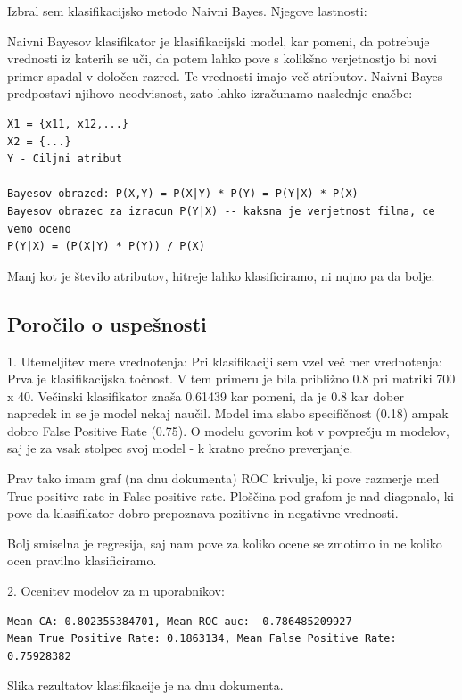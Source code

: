 \documentclass[a4paper,11pt]{article}
\begin{document}
	Izbral sem klasifikacijsko metodo Naivni Bayes. Njegove lastnosti:

Naivni Bayesov klasifikator je klasifikacijski model, kar pomeni, da potrebuje vrednosti iz katerih se uči, da potem lahko
pove s kolikšno verjetnostjo bi novi primer spadal v določen razred.
Te vrednosti imajo več atributov. Naivni Bayes predpostavi njihovo neodvisnost, zato lahko izračunamo naslednje enačbe:
\begin{lstlisting}
X1 = {x11, x12,...}
X2 = {...}
Y - Ciljni atribut

Bayesov obrazed: P(X,Y) = P(X|Y) * P(Y) = P(Y|X) * P(X)
Bayesov obrazec za izracun P(Y|X) -- kaksna je verjetnost filma, ce vemo oceno
P(Y|X) = (P(X|Y) * P(Y)) / P(X)

\end{lstlisting}

Manj kot je število atributov, hitreje lahko klasificiramo, ni nujno pa da bolje.



	\subsection{Poročilo o uspešnosti}
1. Utemeljitev mere vrednotenja:
Pri klasifikaciji sem vzel več mer vrednotenja:
Prva je klasifikacijska točnost. V tem primeru je bila približno 0.8 pri matriki 700 x 40.
Večinski klasifikator znaša 0.61439 kar pomeni, da je 0.8 kar dober napredek in se je model nekaj naučil.
Model ima slabo specifičnost (0.18) ampak dobro False Positive Rate (0.75).
O modelu govorim kot v povprečju m modelov, saj je za vsak stolpec svoj model - k kratno prečno preverjanje.

Prav tako imam graf (na dnu dokumenta) ROC krivulje, ki pove razmerje med True positive rate in False positive rate.
Ploščina pod grafom je nad diagonalo, ki pove da klasifikator dobro prepoznava pozitivne in negativne vrednosti.

Bolj smiselna je regresija, saj nam pove za koliko ocene se zmotimo in ne koliko ocen pravilno klasificiramo.

2. Ocenitev modelov za m uporabnikov:


\begin{lstlisting}
Mean CA: 0.802355384701, Mean ROC auc:  0.786485209927
Mean True Positive Rate: 0.1863134, Mean False Positive Rate:  0.75928382
\end{lstlisting}

Slika rezultatov klasifikacije je na dnu dokumenta.
\end{document}
